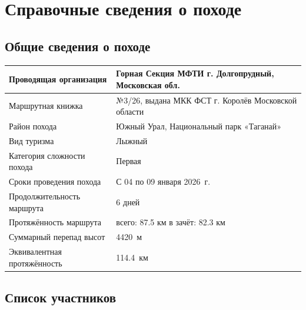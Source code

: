 \section{Справочные сведения о походе} 

\subsection{Общие сведения о походе}

\begin{table}[h]
	\centering
	\begin{tabular}{|l|l|}
		\hline
		Проводящая организация & Горная Секция МФТИ г. Долгопрудный, Московская обл. \\
		\hline
		Маршрутная книжка & №3/26, выдана МКК ФСТ г. Королёв Московской области \\
		\hline
		Район похода & Южный Урал, Национальный парк «Таганай» \\
		\hline
		Вид туризма & Лыжный \\
		\hline
		Категория сложности похода & Первая \\
		\hline
		Сроки проведения похода & С 04 по 09 января 2026~г. \\
		\hline
		Продолжительность маршрута & 6 дней\\
		\hline
		Протяжённость маршрута & всего: 87.5 км \newline в зачёт: 82.3 км \\
		\hline
		Суммарный перепад высот &4420~м \\
		\hline
		Эквивалентная протяжённость & 114.4~км \\
		\hline
	\end{tabular}
\end{table}

\clearpage

\subsection{Список участников}
\vspace{-0.4cm}

